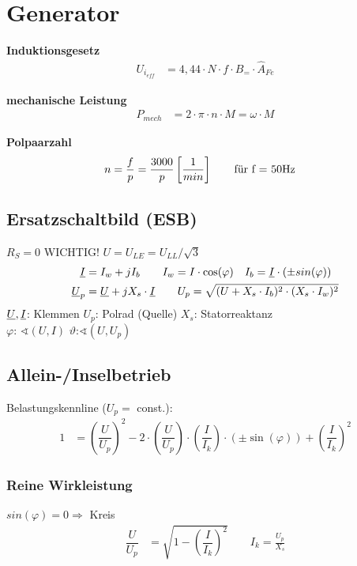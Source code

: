 \clearpage
\section{Generator}
\textbf{Induktionsgesetz}
\begin{align*}
    U_{i_{\mathit{eff}}} &= 4,44 \cdot N \cdot f \cdot B_= \cdot \hat{A}_{Fe}
\end{align*}

\textbf{mechanische Leistung}
\begin{align*}
    P_{mech}&=2\cdot \pi \cdot n \cdot M = \omega \cdot M
\end{align*}

\textbf{Polpaarzahl}
\begin{align*}
    n &=\frac{f}{p}= \dfrac{3000}{p} \left[ \frac{1}{min}\right] \qquad \textnormal{für f = 50Hz}
    \end{align*}

\subsection{Ersatzschaltbild (ESB)}
$R_S = 0$ \qquad WICHTIG! $U = U_{LE} = U_{LL}/\sqrt{3}$
\begin{align*}
    \underline{I} &= I_w +jI_b \qquad I_w = I \cdot \cos(\varphi) \quad I_b = \underline{I}\cdot (\pm sin(\varphi))\\
    \underline{U}_p &= \underline{U} +jX_s \cdot \underline{I} \qquad
    U_p = \sqrt{(U+X_s\cdot I_b)^2 \cdot (X_s\cdot I_w)^2}
\end{align*}
$\underline{U}, \underline{I}$: Klemmen \quad $U_p$: Polrad (Quelle) \quad $X_s$: Statorreaktanz \\
$\varphi$: $\sphericalangle (U, I)$ \qquad $\vartheta$:$\sphericalangle (U, U_p)$

\subsection{Allein-/Inselbetrieb}
Belastungskennline ($U_p=$ const.):
\begin{align*}
    1 &= \left( \dfrac{U}{U_p} \right)^2 - 2 \cdot \left( \dfrac{U}{U_p}\right) \cdot \left( \dfrac{I}{I_k}\right) \cdot (\pm \sin(\varphi)) + \left(\dfrac{I}{I_k}\right)^2
\end{align*}
\subsubsection{Reine Wirkleistung}
$sin(\varphi) = 0 \Rightarrow$ Kreis
\begin{align*}
    \dfrac{U}{U_p} &= \sqrt{1- \left(\dfrac{I}{I_k}\right)^2} \qquad I_k = \frac{U_p}{X_s}
\end{align*}

